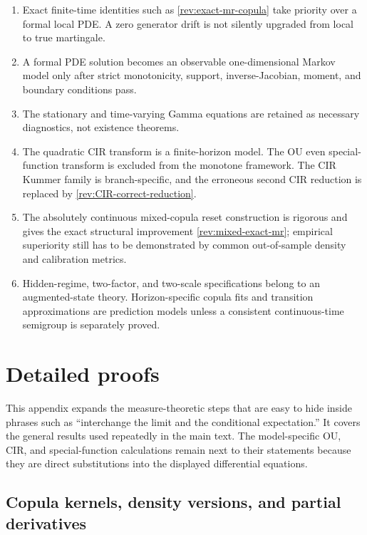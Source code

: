 \documentclass[11pt]{article}
\theoremstyle{remark}
\begin{document}
\begin{enumerate}[label=(\roman*)]
\item Exact finite-time identities such as \eqref{rev:exact-mr-copula} take
priority over a formal local PDE.  A zero generator drift is not silently
upgraded from local to true martingale.
\item A formal PDE solution becomes an observable one-dimensional Markov model
only after strict monotonicity, support, inverse-Jacobian, moment, and boundary
conditions pass.
\item The stationary and time-varying Gamma equations are retained as necessary
diagnostics, not existence theorems.
\item The quadratic CIR transform is a finite-horizon model.  The OU even
special-function transform is excluded from the monotone framework.  The CIR
Kummer family is branch-specific, and the erroneous second CIR reduction is
replaced by \eqref{rev:CIR-correct-reduction}.
\item The absolutely continuous mixed-copula reset construction is rigorous and gives the exact
structural improvement \eqref{rev:mixed-exact-mr}; empirical superiority still
has to be demonstrated by common out-of-sample density and calibration metrics.
\item Hidden-regime, two-factor, and two-scale specifications belong to an
augmented-state theory.  Horizon-specific copula fits and transition
approximations are prediction models unless a consistent continuous-time
semigroup is separately proved.
\end{enumerate}

\fi
\clearpage
\appendix
\section{Detailed proofs}
\label{rev:sec-detailed-proofs}

This appendix expands the measure-theoretic steps that are easy to hide inside
phrases such as ``interchange the limit and the conditional expectation.''
It covers the general results used repeatedly in the main text.  The
model-specific OU, CIR, and special-function calculations remain next to their
statements because they are direct substitutions into the displayed
differential equations.

\subsection{Copula kernels, density versions, and partial derivatives}
\label{rev:app-copula-kernel-proof}
\end{document}
